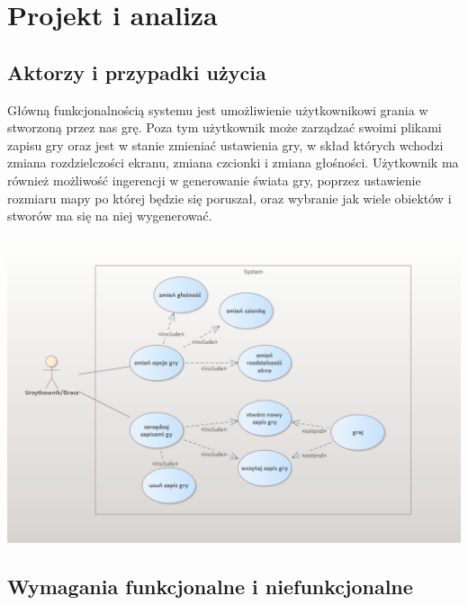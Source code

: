 \documentclass{article}
\begin{document}
\newpage
\section{Projekt i analiza}
\subsection{Aktorzy i przypadki użycia}
Główną funkcjonalnością systemu jest umożliwienie użytkownikowi grania w stworzoną przez nas grę. Poza tym użytkownik może zarządzać swoimi plikami zapisu gry oraz jest w stanie zmieniać ustawienia gry, w skład których wchodzi zmiana rozdzielczości ekranu, zmiana czcionki i zmiana głośności. Użytkownik ma również możliwość ingerencji w generowanie świata gry, poprzez ustawienie rozmiaru mapy po której będzie się poruszał, oraz wybranie jak wiele obiektów i stworów ma się na niej wygenerować.
\begin{center}
     \includegraphics[width=\textwidth]{useCaseDiagram.png}
\end{center}
\subsection{Wymagania funkcjonalne i niefunkcjonalne}
\end{document}
